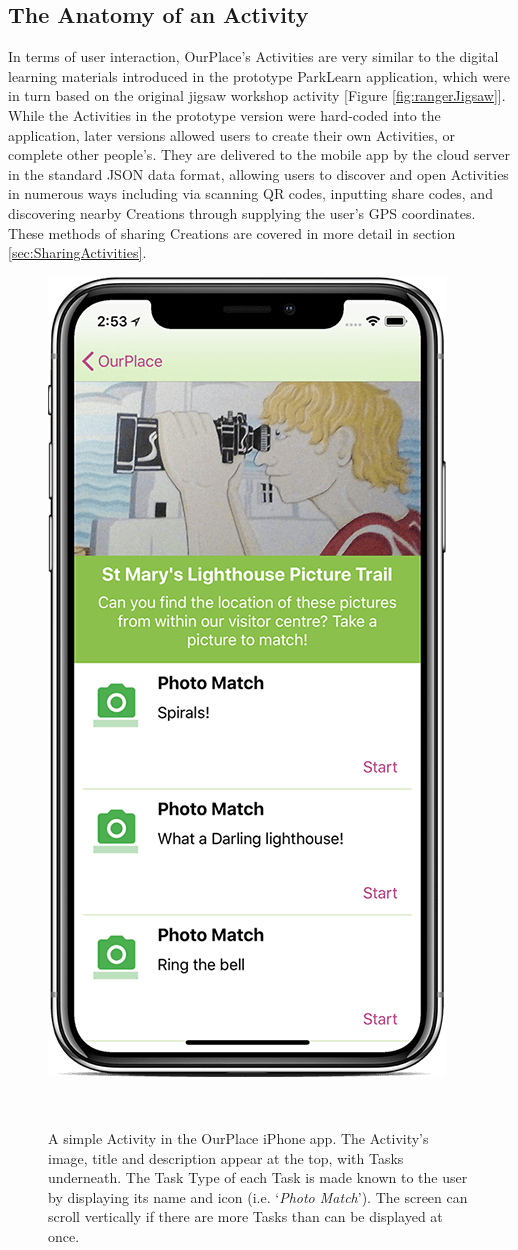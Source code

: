 \subsection{The Anatomy of an Activity}
\label{sec:ActivityOverview}
In terms of user interaction, OurPlace's Activities are very similar to the digital learning materials introduced in the prototype ParkLearn application, which were in turn based on the original jigsaw workshop activity [Figure \ref{fig:rangerJigsaw}]. While the Activities in the prototype version were hard-coded into the application, later versions allowed users to create their own Activities, or complete other people's. They are delivered to the mobile app by the cloud server in the standard JSON data format, allowing users to discover and open Activities in numerous ways including via scanning QR codes, inputting share codes, and discovering nearby Creations through supplying the user's GPS coordinates. These methods of sharing Creations are covered in more detail in section \ref{sec:SharingActivities}. 

\begin{figure}
  \centering
  \includegraphics[width=0.45\columnwidth]{images/chapter05/activity.png}
  \caption[A simple OurPlace Activity]{ A simple Activity in the OurPlace iPhone app. The Activity's image, title and description appear at the top, with Tasks underneath. The Task Type of each Task is made known to the user by displaying its name and icon (i.e. `\textit{Photo Match}'). The screen can scroll vertically if there are more Tasks than can be displayed at once.}~\label{fig:ActivityExample}
\end{figure}

